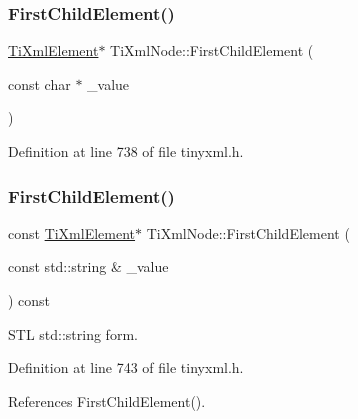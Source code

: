 \hypertarget{class_ti_xml_node_a6936ae323675071808ac4840379e57f5}{}\label{class_ti_xml_node_a6936ae323675071808ac4840379e57f5} 
\subsubsection{\texorpdfstring{First\+Child\+Element()}{FirstChildElement()}\hspace{0.1cm}{\footnotesize\ttfamily [4/6]}}
{\footnotesize\ttfamily \hyperlink{class_ti_xml_element}{Ti\+Xml\+Element}$\ast$ Ti\+Xml\+Node\+::\+First\+Child\+Element (\begin{DoxyParamCaption}\item[{const char $\ast$}]{\+\_\+value }\end{DoxyParamCaption})\hspace{0.3cm}{\ttfamily [inline]}}



Definition at line 738 of file tinyxml.\+h.

\hypertarget{class_ti_xml_node_abfe4a2abe61324def87fe421946f9df9}{}\label{class_ti_xml_node_abfe4a2abe61324def87fe421946f9df9} 
\subsubsection{\texorpdfstring{First\+Child\+Element()}{FirstChildElement()}\hspace{0.1cm}{\footnotesize\ttfamily [5/6]}}
{\footnotesize\ttfamily const \hyperlink{class_ti_xml_element}{Ti\+Xml\+Element}$\ast$ Ti\+Xml\+Node\+::\+First\+Child\+Element (\begin{DoxyParamCaption}\item[{const std\+::string \&}]{\+\_\+value }\end{DoxyParamCaption}) const\hspace{0.3cm}{\ttfamily [inline]}}



S\+TL std\+::string form. 



Definition at line 743 of file tinyxml.\+h.



References First\+Child\+Element().

